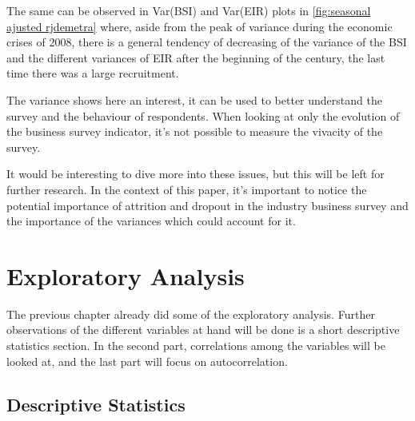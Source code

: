 \documentclass[12pt,a4paper,oneside]{book}
\begin{document}
The same can be observed in Var(BSI) and Var(EIR) plots in \autoref{fig:seasonal ajusted rjdemetra} where, aside from the peak of variance during the economic crises of 2008, there is a general tendency of decreasing of the variance of the BSI and the different variances of EIR after the beginning of the century, the last time there was a large recruitment.

The variance shows here an interest, it can be used to better understand the survey and the behaviour of respondents.
When looking at only the evolution of the business survey indicator, it's not possible to measure the vivacity of the survey.

It would be interesting to dive more into these issues, but this will be left for further research. 
In the context of this paper, it's important to notice the potential importance of attrition and dropout in the industry business survey and the importance of the variances which could account for it.



\chapter{Exploratory Analysis}

The previous chapter already did some of the exploratory analysis.
Further observations of the different variables at hand will be done is a short descriptive statistics section.
In the second part, correlations among the variables will be looked at, and the last part will focus on autocorrelation.


\section{Descriptive Statistics}
\end{document}
